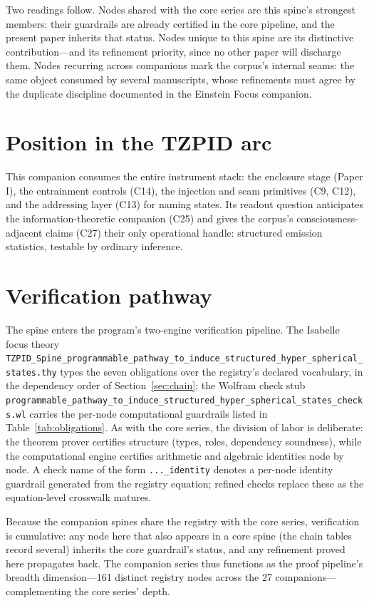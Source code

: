 \documentclass[11pt]{article}
\theoremstyle{remark}
\begin{document}
Two readings follow. Nodes shared with the core series are this spine's strongest members: their guardrails are already certified in the core pipeline, and the present paper inherits that status. Nodes unique to this spine are its distinctive contribution---and its refinement priority, since no other paper will discharge them. Nodes recurring across companions mark the corpus's internal seams: the same object consumed by several manuscripts, whose refinements must agree by the duplicate discipline documented in the Einstein Focus companion.

\section{Position in the TZPID arc}
\label{sec:arc}

This companion consumes the entire instrument stack: the enclosure stage (Paper I), the entrainment controls (C14), the injection and seam primitives (C9, C12), and the addressing layer (C13) for naming states. Its readout question anticipates the information-theoretic companion (C25) and gives the corpus's consciousness-adjacent claims (C27) their only operational handle: structured emission statistics, testable by ordinary inference.

\section{Verification pathway}
\label{sec:verify}

The spine enters the program's two-engine verification pipeline. The Isabelle focus theory \texttt{TZPID\_Spine\_programmable\_pathway\_to\_induce\_structured\_hyper\_spherical\_states.thy} types the seven obligations over the registry's declared vocabulary, in the dependency order of Section~\ref{sec:chain}; the Wolfram check stub \texttt{programmable\_pathway\_to\_induce\_structured\_hyper\_spherical\_states\_checks.wl} carries the per-node computational guardrails listed in Table~\ref{tab:obligations}. As with the core series, the division of labor is deliberate: the theorem prover certifies structure (types, roles, dependency soundness), while the computational engine certifies arithmetic and algebraic identities node by node. A check name of the form \texttt{...\_identity} denotes a per-node identity guardrail generated from the registry equation; refined checks replace these as the equation-level crosswalk matures.

Because the companion spines share the registry with the core series, verification is cumulative: any node here that also appears in a core spine (the chain tables record several) inherits the core guardrail's status, and any refinement proved here propagates back. The companion series thus functions as the proof pipeline's breadth dimension---161 distinct registry nodes across the 27 companions---complementing the core series' depth.
\end{document}
